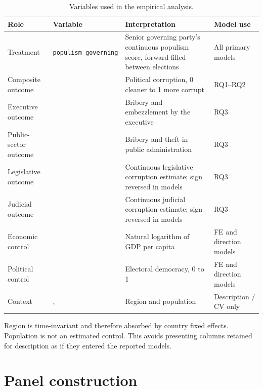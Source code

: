 \begin{table}[H]
\centering
\caption{Variables used in the empirical analysis.}
\label{tab:variables}
\begin{threeparttable}
\small
\begin{tabularx}{\textwidth}{>{\raggedright\arraybackslash}p{3.1cm}>{\raggedright\arraybackslash}p{3.0cm}Y>{\raggedright\arraybackslash}p{2.5cm}}
\toprule
Role & Variable & Interpretation & Model use \\
\midrule
Treatment & \texttt{populism\_}\newline\texttt{governing} & Senior governing party's continuous populism score,
forward-filled between elections & All primary models \\
Composite outcome &  & Political corruption, 0 cleaner to 1 more corrupt & RQ1--RQ2 \\
Executive outcome &  & Bribery and embezzlement by the executive & RQ3 \\
Public-sector outcome &  & Bribery and theft in public administration & RQ3 \\
Legislative outcome &  & Continuous legislative corruption estimate; sign reversed in models & RQ3 \\
Judicial outcome &  & Continuous judicial corruption estimate; sign reversed in models & RQ3 \\
Economic control &  & Natural logarithm of GDP per capita & FE and direction models \\
Political control &  & Electoral democracy, 0 to 1 & FE and direction models \\
Context & ,  & Region and population & Description / CV only \\
\bottomrule
\end{tabularx}
\begin{tablenotes}[flushleft]\footnotesize
\item Region is time-invariant and therefore absorbed by country fixed effects. Population is not an
estimated control. This avoids presenting columns retained for description as if they entered the
reported models.
\end{tablenotes}
\end{threeparttable}
\end{table}

\section{Panel construction}

